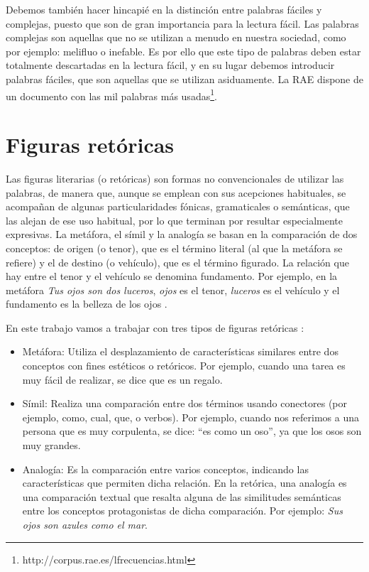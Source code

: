 Debemos también hacer hincapié en la distinción entre palabras fáciles y complejas, puesto que son de gran importancia para la lectura fácil. 
Las palabras complejas son aquellas que no se utilizan a menudo en nuestra sociedad, como por ejemplo: melifluo o inefable. Es por ello que este tipo de palabras deben estar totalmente descartadas en la lectura fácil, y en su lugar debemos introducir palabras fáciles, que son aquellas que se utilizan asiduamente. La RAE dispone de un documento con las mil palabras más usadas\footnote{http://corpus.rae.es/lfrecuencias.html}.




\section{Figuras retóricas}
\label{cap:sec:figurasretoricas}

Las figuras literarias (o retóricas) son formas no convencionales de utilizar las palabras, de manera que, aunque se emplean con sus acepciones habituales, se acompañan de algunas particularidades fónicas, gramaticales o semánticas, que las alejan de ese uso habitual, por lo que terminan por resultar especialmente expresivas. 
La metáfora, el símil y la analogía se basan en la comparación de dos conceptos: de origen (o tenor), que es el término literal (al que la metáfora se refiere) y el de destino (o vehículo), que es el término figurado. La relación que hay entre el tenor y el vehículo se denomina fundamento. Por ejemplo, en la metáfora \textit{Tus ojos son dos luceros}, \textit{ojos} es el tenor, \textit{luceros} es el vehículo y el fundamento es la belleza de los ojos \citep{GalianaYCasas1994}.


En este trabajo vamos a trabajar con tres tipos de figuras retóricas \citep{TFMPaloma}: 
\begin{itemize}
	\item Metáfora: Utiliza el desplazamiento de características similares entre dos conceptos con fines estéticos o retóricos. Por ejemplo, cuando una tarea es muy fácil de realizar, se dice que es un regalo.
	
	\item Símil: Realiza una comparación entre dos términos usando conectores (por ejemplo, como, cual, que, o verbos).
	Por ejemplo, cuando nos referimos a una persona que es muy corpulenta, se dice: ``es como un oso'', ya que los osos son muy grandes.
	
	\item Analogía: Es la comparación entre varios conceptos, indicando las características que permiten dicha relación. En la retórica, una analogía es una comparación textual que resalta alguna de las similitudes semánticas entre los conceptos protagonistas de dicha comparación. Por ejemplo: \textit{Sus ojos son azules como el mar}.
	
	
	
\end{itemize}

